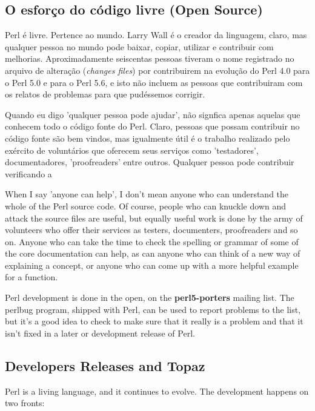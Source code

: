 \documentclass[a4paper,11pt]{book}
\begin{document}
\subsection{O esfor\c{c}o do código livre (Open Source)}

\noindent Perl é livre. Pertence ao mundo. Larry Wall é o creador da linguagem, claro, mas qualquer pessoa no mundo pode baixar, copiar, utilizar e contribuir com melhorias. Aproximadamente seiscentas pessoas tiveram o nome registrado no arquivo de alteração (\textit{changes files}) por contribuirem na evolução do Perl 4.0 para o Perl 5.0 e para o Perl 5.6, e isto não incluem as pessoas que contribuiram com os relatos de problemas para que pudéssemos  corrigir.

\noindent Quando eu digo 'qualquer pessoa pode ajudar', não signfica apenas aquelas que conhecem todo o código fonte do Perl. Claro, pessoas que possam contribuir no código fonte são bem vindos, mas igualmente útil é o trabalho realizado pelo exército de voluntários que oferecem seus serviços como 'testadores', documentadores, 'proofreaders' entre outros. Qualquer pessoa pode contribuir verificando a 

\noindent When I say 'anyone can help', I don't mean anyone who can understand the whole of the Perl source code. Of course, people who can knuckle down and attack the source files are useful, but equally useful work is done by the army of volunteers who offer their services as testers, documenters, proofreaders and so on. Anyone who can take the time to check the spelling or grammar of some of the core documentation can help, as can anyone who can think of a new way of explaining a concept, or anyone who can come up with a more helpful example for a function.

\noindent 

\noindent Perl development  is done  in the  open,  on  the  \textbf{perl5-porters  }mailing  list.  The perlbug program, shipped with Perl,  can be used  to  report  problems  to  the  list,  but it's  a  good idea  to  check  to make sure that it really is a problem and that it isn't fixed in a later or development release of Perl.

\noindent 

\subsection{Developers Releases and Topaz}

\noindent Perl is a living language, and it continues to evolve. The development happens on two fronts:
\end{document}
